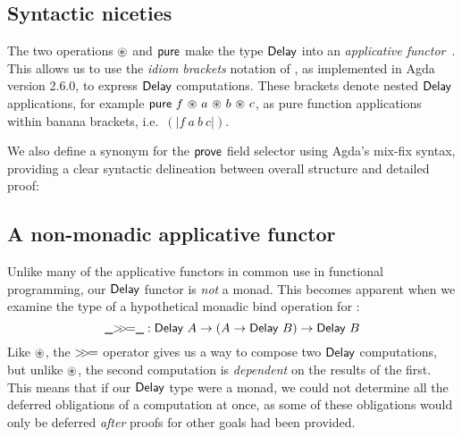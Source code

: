 \documentclass[sigplan]{acmart}%
\begin{document}
\subsection{Syntactic niceties}
The two operations $\circledast$ and $\AgdaFunction{pure}$ 
make the type $\AgdaDatatype{Delay}$ into an \emph{applicative functor}~\citep{applicatives}.
This allows us to use the \emph{idiom brackets} notation of \citet{applicatives}, as implemented in Agda 
version 2.6.0, to express $\AgdaDatatype{Delay}$ computations. These brackets denote nested $\AgdaDatatype{Delay}$ applications, for example $\AgdaFunction{pure}\ f\ \AgdaFunction{\ensuremath\circledast}\ a\ \AgdaFunction{\ensuremath\circledast}\ b\ \AgdaFunction{\ensuremath\circledast}\ c$, 
as pure function applications within banana brackets, i.e.\ $(\!\vert f\ a\ b\ c \vert\!)$.

We also define a synonym for the $\AgdaField{prove}$ field selector using Agda's mix-fix syntax, 
providing a clear syntactic delineation between overall structure and detailed proof:
\begin{code}
\>[2]\AgdaSpace{}%
\AgdaSymbol{=}\AgdaSpace{}%
\<%
\end{code}
\subsection{A non-monadic applicative functor}
Unlike many of the applicative functors in common use in functional programming, 
our $\AgdaDatatype{Delay}$ functor is \emph{not} a monad. This becomes apparent 
when we examine the type of a hypothetical monadic bind operation for :
$$
\AgdaFunction{\AgdaUnderscore{}\ensuremath{>\!\!>\!=}\AgdaUnderscore{}} : \AgdaDatatype{Delay}\ A \rightarrow (A \rightarrow \AgdaDatatype{Delay}\ B) \rightarrow \AgdaDatatype{Delay}\ B
$$
Like $\AgdaFunction{\ensuremath{\circledast}}$, the $\AgdaFunction{\ensuremath{>\!\!>\!=}}$ operator gives us a way to compose 
two $\AgdaDatatype{Delay}$ computations, but 
unlike $\AgdaFunction{\ensuremath{\circledast}}$, the second computation is
 \emph{dependent} on the results of the first. 
 This means that if our $\AgdaDatatype{Delay}$ type were a monad, we could not
 determine all the deferred obligations of a computation at once, 
 as some of these obligations would only be deferred \emph{after} proofs for other 
 goals had been provided.  
\end{document}
